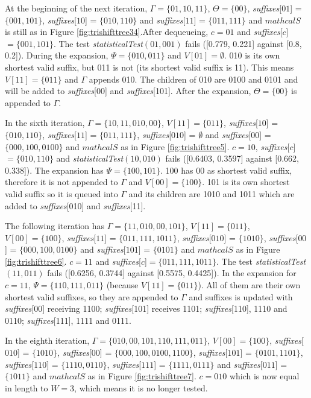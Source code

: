 {At the beginning of the next iteration, $\Gamma = \{01, 10, 11\}$, $\Theta = \{00\}$, \textit{suffixes}[$01$] = $\{001, 101\}$, \textit{suffixes}[$10$] = $\{010, 110\}$ and \textit{suffixes}[$11$] = $\{011, 111\}$ and $mathcal{S}$ is still as in Figure \ref{fig:trishifttree34}.After dequeueing, $c = 01$ and \textit{suffixes}[$c$]$ = \{001, 101\}$. The test \textit{statisticalTest}$(01,001)$ fails ([0.779, 0.221] against [0.8, 0.2]). During the expansion, $\Psi = \{010, 011\}$ and $V[01] = \emptyset$. 010 is its own shortest valid suffix, but 011 is not (its shortest valid suffix is 11). This means $V[11] = \{011\}$ and $\Gamma$ appends 010. The children of 010 are 0100 and 0101 and will be added to \textit{suffixes}[00] and \textit{suffixes}[101]. After the expansion, $\Theta = \{00\}$ is appended to $\Gamma$.

In the sixth iteration, $\Gamma = \{10, 11, 010, 00\}$, $V[11] = \{011\}$, \textit{suffixes}[$10$] = $\{010, 110\}$, \textit{suffixes}[$11$] = $\{011, 111\}$,  \textit{suffixes}[$010$] = $\emptyset$ and  \textit{suffixes}[$00$] = $\{000, 100, 0100\}$ and $mathcal{S}$ as in Figure \ref{fig:trishifttree5}. $c = 10$, \textit{suffixes}[$c$]$ = \{010, 110\}$ and \textit{statisticalTest}$(10,010)$ fails ([0.6403, 0.3597] against [0.662, 0.338]). The expansion has $\Psi = \{100, 101\}$. 100 has 00 as shortest valid suffix, therefore it is not appended to $\Gamma$ and $V[00] = \{100\}$. 101 is its own shortest valid suffix so it is queued into $\Gamma$ and its children are 1010 and 1011 which are added to \textit{suffixes}[010] and \textit{suffixes}[11].

The following iteration has $\Gamma = \{11, 010, 00, 101\}$, $V[11] = \{011\}$, $V[00] = \{100\}$, \textit{suffixes}[$11$] = $\{011, 111, 1011\}$,  \textit{suffixes}[$010$] = $\{1010\}$, \textit{suffixes}[$00$] = $\{000, 100, 0100\}$ and \textit{suffixes}[$101$] = $\{0101\}$ and $mathcal{S}$ as in Figure \ref{fig:trishifttree6}. $c = 11$ and \textit{suffixes}[$c$]$ = \{011, 111, 1011\}$. The test \textit{statisticalTest}$(11,011)$ fails ([0.6256, 0.3744] against [0.5575, 0.4425]). In the expansion for $c = 11$, $\Psi = \{110, 111, 011\}$ (because $V[11] = \{011\}$).  All of them are their own shortest valid suffixes, so they are appended to $\Gamma$ and suffixes is updated with \textit{suffixes}[00] receiving 1100; \textit{suffixes}[101] receives 1101; \textit{suffixes}[110], 1110 and 0110; \textit{suffixes}[111], 1111 and 0111.

In the eighth iteration, $\Gamma = \{010, 00, 101, 110, 111, 011\}$, $V[00] = \{100\}$, \textit{suffixes}[$010$] = $\{1010\}$, \textit{suffixes}[$00$] = $\{000, 100, 0100, 1100\}$, \textit{suffixes}[$101$] = $\{0101, 1101\}$, \textit{suffixes}[$110$] = $\{1110, 0110\}$, \textit{suffixes}[$111$] = $\{1111, 0111\}$ and \textit{suffixes}[$011$] = $\{1011\}$ and $mathcal{S}$ as in Figure \ref{fig:trishifttree7}. $c = 010$ which is now equal in length to $W = 3$, which means it is no longer tested.

}
